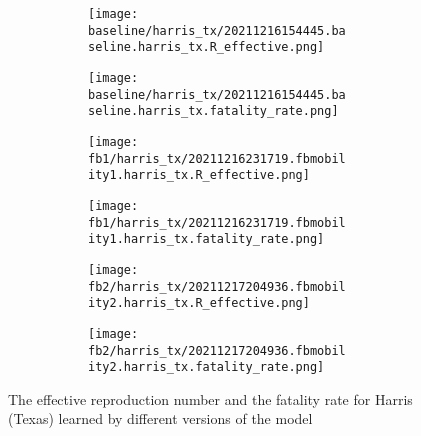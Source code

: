 \begin{figure}[!htb]
    \centering

    \begin{subfigure}[b]{\linewidth}
        \centering
        \begin{subfigure}[b]{0.4\linewidth}
            \texttt{[image: baseline/harris\_tx/20211216154445.baseline.harris\_tx.R\_effective.png]}
        \end{subfigure}
        \begin{subfigure}[b]{0.4\linewidth}
            \texttt{[image: baseline/harris\_tx/20211216154445.baseline.harris\_tx.fatality\_rate.png]}
        \end{subfigure}
    \end{subfigure}

    \begin{subfigure}[b]{\linewidth}
        \centering
        \begin{subfigure}[b]{0.4\linewidth}
            \texttt{[image: fb1/harris\_tx/20211216231719.fbmobility1.harris\_tx.R\_effective.png]}
        \end{subfigure}
        \begin{subfigure}[b]{0.4\linewidth}
            \texttt{[image: fb1/harris\_tx/20211216231719.fbmobility1.harris\_tx.fatality\_rate.png]}
        \end{subfigure}
    \end{subfigure}

    \begin{subfigure}[b]{\linewidth}
        \centering
        \begin{subfigure}[b]{0.4\linewidth}
            \texttt{[image: fb2/harris\_tx/20211217204936.fbmobility2.harris\_tx.R\_effective.png]}
        \end{subfigure}
        \begin{subfigure}[b]{0.4\linewidth}
            \texttt{[image: fb2/harris\_tx/20211217204936.fbmobility2.harris\_tx.fatality\_rate.png]}
        \end{subfigure}
    \end{subfigure}

    \caption{The effective reproduction number and the fatality rate for Harris (Texas) learned by different versions of the model}
    \label{fig:R0-and-fatality-harris}
\end{figure}


